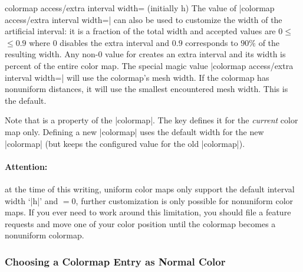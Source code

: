 {\begin{pgfplotskey}{colormap access/extra interval width= (initially h)}
    The value of |colormap access/extra interval width=| can
    also be used to customize the width of the artificial interval: it is a
    fraction of the total width and accepted values are $0\le
    $$\le 0.9$ where $0$ disables the extra interval and $0.9$
    corresponds to $90\%$ of the resulting width. Any non-$0$ value for
     creates an extra interval and its width is 
    percent of the entire color map. The special magic value
    |colormap access/extra interval width=| will use the
    colormap's mesh width. If the colormap has nonuniform distances, it will
    use the smallest encountered mesh width. This is the default.

    Note that  is a property of the |colormap|. The key defines
    it for the \emph{current} color map only. Defining a new |colormap| uses
    the default width for the new |colormap| (but keeps the configured value
    for the old |colormap|).


    \paragraph{Attention:}

    at the time of this writing, uniform color maps only support the default
    interval width `|h|' and $=0$, further customization is only
    possible for nonuniform color maps. If you ever need to work around this
    limitation, you should file a feature requests and move one of your color
    position until the colormap becomes a nonuniform colormap.
\end{pgfplotskey}

}%


\subsubsection{Choosing a Colormap Entry as Normal Color}

